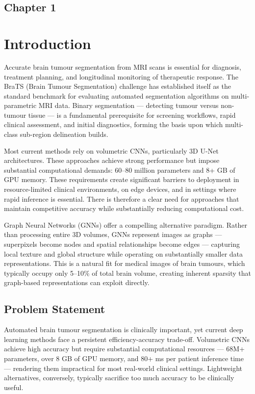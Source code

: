\begin{center}
    \section*{\fontsize{20}{20}\selectfont Chapter 1}
\end{center}
\vspace{10mm}
\section{Introduction}

Accurate brain tumour segmentation from MRI scans is essential for diagnosis, treatment planning, and longitudinal monitoring of therapeutic response. The BraTS (Brain Tumour Segmentation) challenge has established itself as the standard benchmark for evaluating automated segmentation algorithms on multi-parametric MRI data. Binary segmentation — detecting tumour versus non-tumour tissue — is a fundamental prerequisite for screening workflows, rapid clinical assessment, and initial diagnostics, forming the basis upon which multi-class sub-region delineation builds.

Most current methods rely on volumetric CNNs, particularly 3D U-Net architectures. These approaches achieve strong performance but impose substantial computational demands: 60--80 million parameters and 8+ GB of GPU memory. These requirements create significant barriers to deployment in resource-limited clinical environments, on edge devices, and in settings where rapid inference is essential. There is therefore a clear need for approaches that maintain competitive accuracy while substantially reducing computational cost.

Graph Neural Networks (GNNs) offer a compelling alternative paradigm. Rather than processing entire 3D volumes, GNNs represent images as graphs — superpixels become nodes and spatial relationships become edges — capturing local texture and global structure while operating on substantially smaller data representations. This is a natural fit for medical images of brain tumours, which typically occupy only 5--10\% of total brain volume, creating inherent sparsity that graph-based representations can exploit directly.


\subsection{Problem Statement}

Automated brain tumour segmentation is clinically important, yet current deep learning methods face a persistent efficiency-accuracy trade-off. Volumetric CNNs achieve high accuracy but require substantial computational resources — 68M+ parameters, over 8 GB of GPU memory, and 80+ ms per patient inference time — rendering them impractical for most real-world clinical settings. Lightweight alternatives, conversely, typically sacrifice too much accuracy to be clinically useful.

